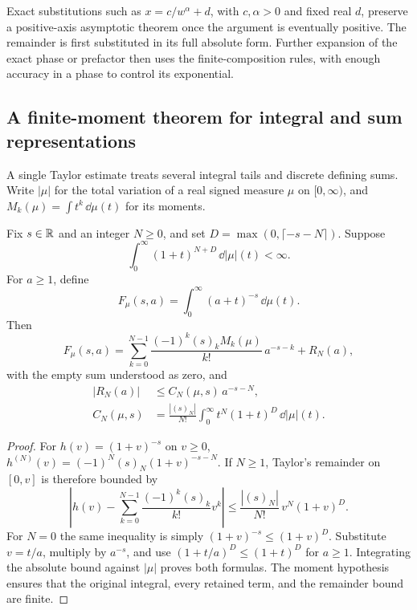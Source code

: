Exact substitutions such as $x=c/w^\alpha+d$, with $c,\alpha>0$ and
fixed real $d$, preserve a positive-axis asymptotic theorem once the
argument is eventually positive. The remainder is first substituted
in its full absolute form. Further expansion of the exact phase or
prefactor then uses the finite-composition rules, with enough accuracy
in a phase to control its exponential.

\subsection{A finite-moment theorem for integral and sum representations}

A single Taylor estimate treats several integral tails and discrete
defining sums. Write $|\mu|$ for the total variation of a real signed
measure $\mu$ on $[0,\infty)$, and
$M_k(\mu)=\int t^k\,\dd\mu(t)$ for its moments.

\begin{theorem}
\label{thm:special-function-moment-expansion}
Fix $s\in\mathbb R$ and an integer $N\ge0$, and set
$D=\max(0,\lceil-s-N\rceil)$. Suppose
\[
 \int_0^\infty(1+t)^{N+D}\,\dd|\mu|(t)<\infty.
\]
For $a\ge1$, define
\[
 F_\mu(s,a)=\int_0^\infty(a+t)^{-s}\,\dd\mu(t).
\]
Then
\begin{equation}
 F_\mu(s,a)=
 \sum_{k=0}^{N-1}\frac{(-1)^k(s)_kM_k(\mu)}{k!}\,a^{-s-k}
       +R_N(a),
 \label{eq:special-function-moment-expansion}
\end{equation}
with the empty sum understood as zero, and
\begin{equation}
\begin{aligned}
 |R_N(a)|&\le C_N(\mu,s)\,a^{-s-N},\\
 C_N(\mu,s)&=
  \frac{|(s)_N|}{N!}
       \int_0^\infty t^N(1+t)^D\,\dd|\mu|(t).
\end{aligned}
\label{eq:special-function-moment-bound}
\end{equation}
\end{theorem}
\begin{proof}
For $h(v)=(1+v)^{-s}$ on $v\ge0$,
$h^{(N)}(v)=(-1)^N(s)_N(1+v)^{-s-N}$. If $N\ge1$,
Taylor's remainder on $[0,v]$ is therefore bounded by
\[
 \left|h(v)-\sum_{k=0}^{N-1}
                \frac{(-1)^k(s)_k}{k!}v^k\right|
       \le \frac{|(s)_N|}{N!}\,v^N(1+v)^D.
\]
For $N=0$ the same inequality is simply
$(1+v)^{-s}\le(1+v)^D$.
Substitute $v=t/a$, multiply by $a^{-s}$, and use
$(1+t/a)^D\le(1+t)^D$ for $a\ge1$. Integrating the absolute
bound against $|\mu|$ proves both formulas. The moment hypothesis
ensures that the original integral, every retained term, and the
remainder bound are finite.
\end{proof}

